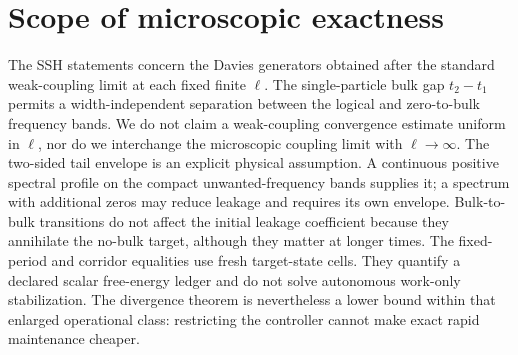 \documentclass[11pt,a4paper]{article}
\theoremstyle{remark}
\begin{document}
\section{Scope of microscopic exactness}
The SSH statements concern the Davies generators obtained after the standard weak-coupling limit at each fixed finite $\ell$. The single-particle bulk gap $t_2-t_1$ permits a width-independent separation between the logical and zero-to-bulk frequency bands. We do not claim a weak-coupling convergence estimate uniform in $\ell$, nor do we interchange the microscopic coupling limit with $\ell\to \infty$.
The two-sided tail envelope is an explicit physical assumption. A continuous positive spectral profile on the compact unwanted-frequency bands supplies it; a spectrum with additional zeros may reduce leakage and requires its own envelope. Bulk-to-bulk transitions do not affect the initial leakage coefficient because they annihilate the no-bulk target, although they matter at longer times.
The fixed-period and corridor equalities use fresh target-state cells. They quantify a declared scalar free-energy ledger and do not solve autonomous work-only stabilization. The divergence theorem is nevertheless a lower bound within that enlarged operational class: restricting the controller cannot make exact rapid maintenance cheaper.
\end{document}
